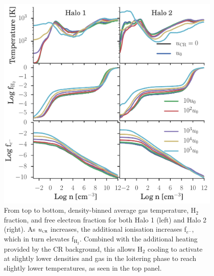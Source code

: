 \documentclass{thesis}
\newcommand{\htwo}{\ensuremath{\mathrm{H}_2}\xspace}
\newcommand{\ucr}{\ensuremath{{u}_{\textsc{cr}}}\xspace}
\begin{document}
\begin{figure}
\begin{center}
\includegraphics[width=1\columnwidth]{figures/binned_T_efrac/binned_T_efrac}
\caption{\label{fig:efrac}
From top to bottom, density-binned average gas temperature, $\htwo$ fraction, and free electron fraction for both Halo 1 (left) and Halo 2  (right). 
As $\ucr$ increases, the additional ionisation increases f$_{e^-}$, which in turn elevates f$_{\htwo}$. 
Combined with the additional heating provided by the CR background, this allows $\htwo$ cooling to activate at slightly lower densities and gas in the loitering phase to reach slightly lower temperatures, as seen in the top panel.%
}
\end{center}
\end{figure}
\end{document}

